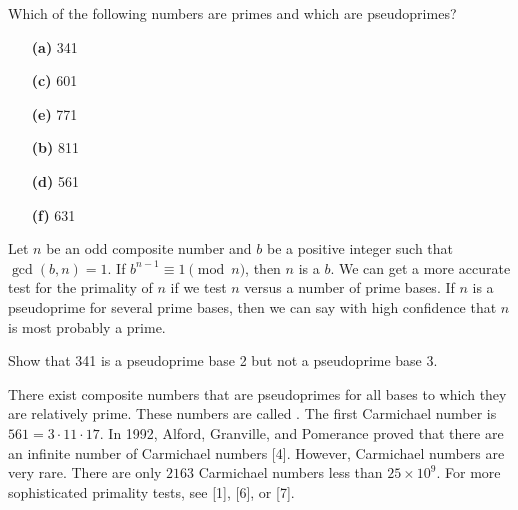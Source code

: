 \begin{exercise}{}
Which of the following numbers are primes  and which are pseudoprimes?
  
\vspace{3pt}        %
 
\hspace{-7pt}
\begin{minipage}[t]{4.6in}
\noindent
\begin{minipage}[t]{2.25in}
\begin{itemize}
 
 \item[{\bf (a)}]
341
 
 \item[{\bf (c)}]
601
 
 \item[{\bf (e)}]
771
 
\end{itemize}
\end{minipage} \hfill
\begin{minipage}[t]{2.25in}
\begin{itemize}
 
 \item[{\bf (b)}]
811
 
 \item[{\bf (d)}]
561
 
 \item[{\bf (f)}]
631
 
\end{itemize}
\end{minipage}
\end{minipage}
 
\vspace{2pt}        %
\end{exercise} 
 
Let $n$ be an odd composite number and $b$ be a positive integer such
that $\gcd(b, n) = 1$. If $b^{n-1} \equiv 1 \pmod{n}$, then $n$ is a
 $b$. We can get a more accurate test for the  primality of $n$  if we 
test $n$ versus a number of prime bases. If $n$ is a pseudoprime for several prime bases, then we can say with high confidence that $n$ is most probably a prime.


\begin{exercise}{}
Show that 341 is a pseudoprime base 2 but
not a pseudoprime base 3.
\end{exercise}  

There exist composite numbers that are pseudoprimes for all bases to
which they are relatively prime.  These numbers are called . The first Carmichael
number is $561 = 3 \cdot 11 \cdot 17$.  In 1992, Alford, Granville, and
Pomerance proved that there are an infinite number of Carmichael
numbers [4].  However, Carmichael numbers are very rare.  There are
only $2163$ Carmichael numbers less than $25 \times 10^9$. For more
sophisticated primality tests, see [1], [6], or [7].  
 
